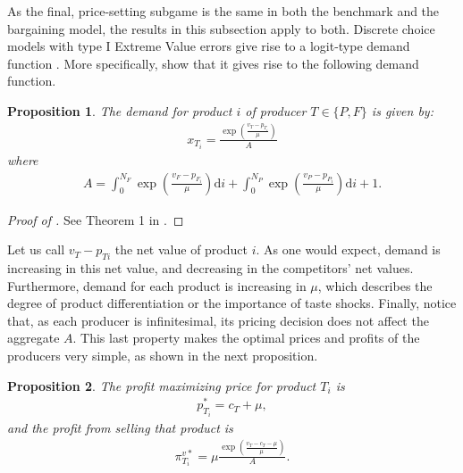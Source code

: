 \documentclass[a4paper]{article}
\newtheorem{proposition}{Proposition}
\newcommand{\di}{\mathrm{d}i}
\begin{document}
As the final, price-setting subgame is the same in both the benchmark and the bargaining model, the results in this subsection apply to both.
Discrete choice models with type I Extreme Value errors give rise to a logit-type demand function \parencite[e.g.][]{small1981applied}.
More specifically, \textcite[]{anderson2021hybrid} show that it gives rise to the following demand function.
\begin{proposition}
    \label{prop:demand_function}
    The demand for product $i$ of producer $T \in \{P, F\}$ is given by:
    \begin{align*}
        x_{T_i} = \frac{\exp\left( \frac{v_T - p_{T_i}}{\mu} \right)}{A}
    \end{align*}
    where
    \begin{align}
        A = \int_0^{N_F} \exp\left( \frac{v_F - p_{F_i}}{\mu} \right) \di + \int_0^{N_P} \exp\left( \frac{v_P - p_{P_i}}{\mu} \right) \di + 1.
        \label{eq:aggregate}
    \end{align}
\end{proposition}
\begin{proof}[Proof of ]
    See Theorem 1 in \textcite{anderson2021hybrid}.
\end{proof}

Let us call $v_T - p_{Ti}$ the net value of product $i$.
As one would expect, demand is increasing in this net value, and decreasing in the competitors' net values.
Furthermore, demand for each product is increasing in $\mu$, which describes the degree of product differentiation or the importance of taste shocks.
Finally, notice that, as each producer is infinitesimal, its pricing decision does not affect the aggregate $A$.
This last property makes the optimal prices and profits of the producers very simple, as shown in the next proposition.
\begin{proposition}
    \label{prop:optimal_profit}
    The profit maximizing price for product $T_i$ is
    \begin{align*}
        p^*_{T_i} = c_T + \mu,
    \end{align*}
    and the profit from selling that product is
    \begin{align}
        \pi^{v*}_{T_i} = \mu \frac{\exp \left( \frac{v_T - c_T - \mu}{\mu} \right)}{A}.
        \label{eq:optimal_profit}
    \end{align}
\end{proposition}
\end{document}
